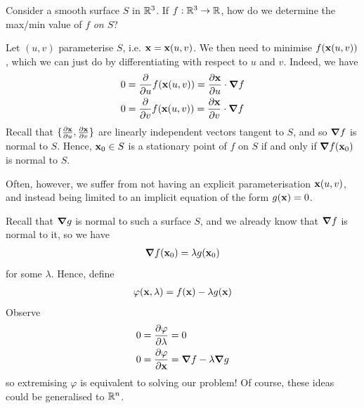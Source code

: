 \documentclass{../../template/note}
\begin{document}
    Consider a smooth surface $S$ in $\mathbb R^3$. If $f: \mathbb R^3 \to \mathbb R$, how do we determine the max/min value of $f$ \emph{on $S$}?

    Let $(u, v)$ parameterise $S$, i.e. $\V x = \V x(u, v)$. We then need to minimise $f(\V x(u, v))$, which we can just do by differentiating with respect to $u$ and $v$. Indeed, we have
    \begin{align*}
        0 &= \pd{}{u} f(\V x(u, v)) = \pd{\V x}{u} \cdot \grad f \\
        0 &= \pd{}{v} f(\V x(u, v)) = \pd{\V x}{v} \cdot \grad f
    \end{align*}
    Recall that $\{\pd{\V x}{u}, \pd{\V x}{v}\}$ are linearly independent vectors tangent to $S$, and so $\grad f$ is normal to $S$. Hence, $\V x_0 \in S$ is a stationary point of $f$ on $S$ if and only if $\grad f(\V x_0)$ is normal to $S$.

    Often, however, we suffer from not having an explicit parameterisation $\V x(u, v)$, and instead being limited to an implicit equation of the form $g(\V x) = 0$.

    Recall that $\grad g$ is normal to such a surface $S$, and we already know that $\grad f$ is normal to it, so we have
    \begin{align*}
        \grad f(\V x_0) = \lambda g(\V x_0)
    \end{align*}
    for some $\lambda$. Hence, define
    \begin{align*}
        \varphi(\V x, \lambda)  = f(\V x) - \lambda g(\V x)
    \end{align*}
    Observe
    \begin{align*}
        0 &= \pd{\varphi}{\lambda} = 0 \\
        0 &= \pd{\varphi}{\V x} = \grad f - \lambda \grad g
    \end{align*}
    so extremising $\varphi$ is equivalent to solving our problem! Of course, these ideas could be generalised to $\mathbb R^n$.
\end{document}
